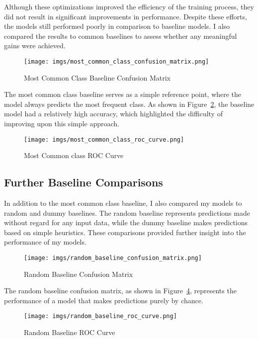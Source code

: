 \documentclass[14]{article}
\begin{document}
Although these optimizations improved the efficiency of the training process, they did not result in significant improvements in performance. Despite these efforts, the models still performed poorly in comparison to baseline models. I also compared the results to common baselines to assess whether any meaningful gains were achieved.

\begin{figure}[h]
    \centering
    \texttt{[image: imgs/most\_common\_class\_confusion\_matrix.png]}
    \caption{Most Common Class Baseline Confusion Matrix}
    \label{fig:most_common_confuse}
\end{figure}

The most common class baseline serves as a simple reference point, where the model always predicts the most frequent class. As shown in Figure~\ref{fig:most_common_roc}, the baseline model had a relatively high accuracy, which highlighted the difficulty of improving upon this simple approach.

\begin{figure}[h]
    \centering
    \texttt{[image: imgs/most\_common\_class\_roc\_curve.png]}
    \caption{Most Common class ROC Curve}
    \label{fig:most_common_roc}
\end{figure}

\subsection{Further Baseline Comparisons}

In addition to the most common class baseline, I also compared my models to random and dummy baselines. The random baseline represents predictions made without regard for any input data, while the dummy baseline makes predictions based on simple heuristics. These comparisons provided further insight into the performance of my models.

\begin{figure}[h]
    \centering
    \texttt{[image: imgs/random\_baseline\_confusion\_matrix.png]}
    \caption{Random Baseline Confusion Matrix}
    \label{fig:random_confuse}
\end{figure}

The random baseline confusion matrix, as shown in Figure~\ref{fig:random_roc}, represents the performance of a model that makes predictions purely by chance.

\begin{figure}[h]
    \centering
    \texttt{[image: imgs/random\_baseline\_roc\_curve.png]}
    \caption{Random Baseline ROC Curve}
    \label{fig:random_roc}
\end{figure}
\end{document}
